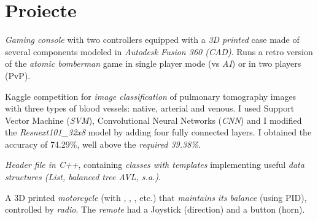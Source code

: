 %


\section{Proiecte}

{
\emph{Gaming console} with two controllers equipped with a \emph{3D printed} case made of several components modeled in \emph{Autodesk Fusion 360 (CAD)}. Runs a retro version of the \emph{atomic bomberman} game in single player mode (vs \emph{AI}) or in two players (PvP).
}

{
Kaggle competition for \emph{image classification} of pulmonary tomography images with three types of blood vessels: native, arterial and venous. I used Support Vector Machine (\emph{SVM}), Convolutional Neural Networks (\emph{CNN}) and I modified the \emph{Resnext101\_32x8} model by adding four fully connected layers. I obtained the accuracy of {74.29\%}, well above the \emph{required 39.38\%}.
}

{
\emph{Header file in C++}, containing \emph{classes with templates} implementing useful \emph{data structures (List, balanced tree AVL, s.a.)}.
}

{
A 3D printed \emph{motorcycle} (with , , , etc.) that \emph{maintains its balance} (using PID), controlled by \emph{radio}. The \emph{remote} had a Joystick (direction) and a button (horn).
}

